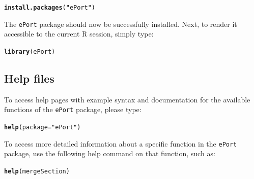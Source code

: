 \documentclass{article}\usepackage[]{graphicx}\usepackage[]{color}
\makeatletter
\newcommand{\hlstr}[1]{\textcolor[rgb]{0.192,0.494,0.8}{#1}}%
\newcommand{\hlstd}[1]{\textcolor[rgb]{0.345,0.345,0.345}{#1}}%
\newcommand{\hlkwc}[1]{\textcolor[rgb]{0.333,0.667,0.333}{#1}}%
\newcommand{\hlkwd}[1]{\textcolor[rgb]{0.737,0.353,0.396}{\textbf{#1}}}%
\newenvironment{kframe}{%
 \def\at@end@of@kframe{}%
 \ifinner\ifhmode%
  \def\at@end@of@kframe{\end{minipage}}%
  \begin{minipage}{\columnwidth}%
 \fi\fi%
 \def\FrameCommand##1{\hskip\@totalleftmargin \hskip-\fboxsep
 \colorbox{shadecolor}{##1}\hskip-\fboxsep
     \hskip-\linewidth \hskip-\@totalleftmargin \hskip\columnwidth}%
 \MakeFramed {\advance\hsize-\width
   \@totalleftmargin\z@ \linewidth\hsize
   \@setminipage}}%
 {\par\unskip\endMakeFramed%
 \at@end@of@kframe}
\newenvironment{knitrout}{}{} %
\numberwithin{equation}{section} %
\newcommand{\pkg}[1]{{\texttt{#1}}}
\newcommand{\R}{{\normalfont\textsf{R }}{}}
\makeatother
\begin{document}
\begin{knitrout}
\color{fgcolor}\begin{kframe}
\begin{alltt}
\hlkwd{install.packages}\hlstd{(}\hlstr{"ePort"}\hlstd{)}
\end{alltt}
\end{kframe}
\end{knitrout}

\noindent
The \pkg{ePort} package should now be successfully installed. Next, to render it accessible to the current \R session, simply type:

\begin{knitrout}
\color{fgcolor}\begin{kframe}
\begin{alltt}
\hlkwd{library}\hlstd{(ePort)}
\end{alltt}
\end{kframe}
\end{knitrout}

\subsection{Help files}
\label{sec:helpSection}

To access help pages with example syntax and documentation for the available functions of the \pkg{ePort} package, please type:

\begin{knitrout}
\color{fgcolor}\begin{kframe}
\begin{alltt}
\hlkwd{help}\hlstd{(}\hlkwc{package}\hlstd{=}\hlstr{"ePort"}\hlstd{)}
\end{alltt}
\end{kframe}
\end{knitrout}

To access more detailed information about a specific function in the \pkg{ePort} package, use the following help command on that function, such as:

\begin{knitrout}
\color{fgcolor}\begin{kframe}
\begin{alltt}
\hlkwd{help}\hlstd{(mergeSection)}
\end{alltt}
\end{kframe}
\end{knitrout}
\end{document}
